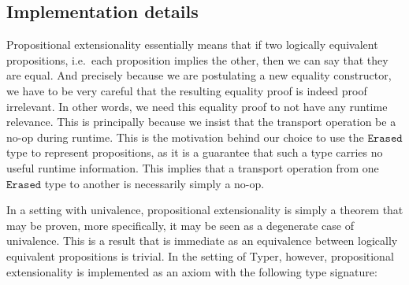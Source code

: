 \documentclass[12pt,twoside,maitrise]{dms}
\theoremstyle{definition}
\numberwithin{equation}{section}
\numberwithin{table}{chapter}
\numberwithin{figure}{chapter}
\newcommand\kw[1] {\textsf{#1}}
\newcommand\id[1] {\texttt{#1}}
\begin{document}

\subsection*{Implementation details}

Propositional extensionality essentially means that if two logically equivalent
propositions, i.e.\ each proposition implies the other, then we can say that
they are equal. And precisely because we are postulating a new equality
constructor, we have to be very careful that the resulting equality proof is
indeed proof irrelevant. In other words, we need this equality proof to not have
any runtime relevance. This is principally because we insist that the transport
operation be a no-op during runtime. This is the motivation behind our choice to
use the $\id{Erased}$ type to represent propositions, as it is a guarantee that
such a type carries no useful runtime information. This implies that a transport
operation from one $\id{Erased}$ type to another is necessarily simply a no-op.

In a setting with univalence, propositional extensionality is simply a theorem
that may be proven, more specifically, it may be seen as a degenerate case of univalence\cite{sozeau2013univalence}. This is a result that is
immediate as an equivalence between logically equivalent propositions is
trivial. In the setting of Typer, however, propositional extensionality is
implemented as an axiom with the following type signature:
\end{document}
